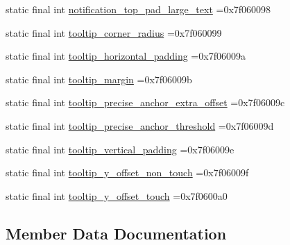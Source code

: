 \begin{DoxyCompactItemize}
\item 
static final int \mbox{\hyperlink{classbr_1_1unb_1_1cic_1_1mp_1_1marketmaster_1_1R_1_1dimen_a75ea0b94fcc687a52adc17171078f9c4}{notification\+\_\+top\+\_\+pad\+\_\+large\+\_\+text}} =0x7f060098
\item 
static final int \mbox{\hyperlink{classbr_1_1unb_1_1cic_1_1mp_1_1marketmaster_1_1R_1_1dimen_a37155677216e5bcfcc83a1a36fb3f874}{tooltip\+\_\+corner\+\_\+radius}} =0x7f060099
\item 
static final int \mbox{\hyperlink{classbr_1_1unb_1_1cic_1_1mp_1_1marketmaster_1_1R_1_1dimen_a4af89999c348495a47b9bfd36385ae8d}{tooltip\+\_\+horizontal\+\_\+padding}} =0x7f06009a
\item 
static final int \mbox{\hyperlink{classbr_1_1unb_1_1cic_1_1mp_1_1marketmaster_1_1R_1_1dimen_aab25210b7c4ed88963e89b48b96ea746}{tooltip\+\_\+margin}} =0x7f06009b
\item 
static final int \mbox{\hyperlink{classbr_1_1unb_1_1cic_1_1mp_1_1marketmaster_1_1R_1_1dimen_aabacc6f8e000c191facea04d9c98db9c}{tooltip\+\_\+precise\+\_\+anchor\+\_\+extra\+\_\+offset}} =0x7f06009c
\item 
static final int \mbox{\hyperlink{classbr_1_1unb_1_1cic_1_1mp_1_1marketmaster_1_1R_1_1dimen_abafa26af5164024e5da0ba48d4aba7e5}{tooltip\+\_\+precise\+\_\+anchor\+\_\+threshold}} =0x7f06009d
\item 
static final int \mbox{\hyperlink{classbr_1_1unb_1_1cic_1_1mp_1_1marketmaster_1_1R_1_1dimen_a08beece2ba0e5a63a53208c9c3230d1f}{tooltip\+\_\+vertical\+\_\+padding}} =0x7f06009e
\item 
static final int \mbox{\hyperlink{classbr_1_1unb_1_1cic_1_1mp_1_1marketmaster_1_1R_1_1dimen_a3c7fdbe9b2c9076af3f5449d6935b97c}{tooltip\+\_\+y\+\_\+offset\+\_\+non\+\_\+touch}} =0x7f06009f
\item 
static final int \mbox{\hyperlink{classbr_1_1unb_1_1cic_1_1mp_1_1marketmaster_1_1R_1_1dimen_af25a3a4abb90d3f7e200aa34167786ee}{tooltip\+\_\+y\+\_\+offset\+\_\+touch}} =0x7f0600a0
\end{DoxyCompactItemize}


\subsection{Member Data Documentation}
\mbox{\label{classbr_1_1unb_1_1cic_1_1mp_1_1marketmaster_1_1R_1_1dimen_a30b76e32481d5ff789e925eecc53d360}} 
